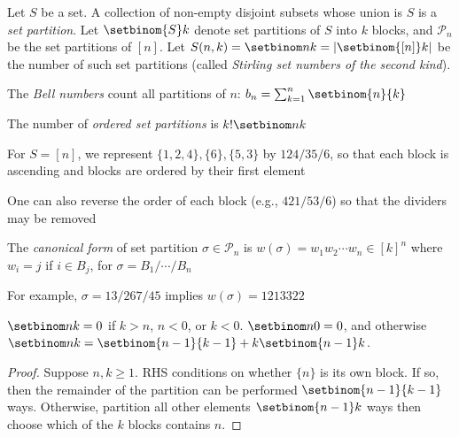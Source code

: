 \documentclass[a4paper]{article}
\begin{document}
\begin{definition}
Let $S$ be a set. A collection of non-empty disjoint subsets whose union is $S$ is a \emph{set partition}. Let $\setbinom{S}k$ denote set partitions of $S$ into $k$ blocks, and $\mathcal P_n$ be the set partitions of $[n]$. Let $S(n,k)=\setbinom nk=\left|\setbinom{[n]}k\right|$ be the number of such set partitions (called \emph{Stirling set numbers of the second kind}).
\begin{arrows}
\item The \emph{Bell numbers} count all partitions of $n$: $b_n=\sum_{k=1}^n\setbinom{n}{k}$
\item The number of \emph{ordered set partitions} is $k!\setbinom nk$
\item For $S=[n]$, we represent $\{1,2,4\},\{6\},\{5,3\}$ by $124/35/6$, so that each block is ascending and blocks are ordered by their first element
\item One can also reverse the order of each block (e.g., $421/53/6$) so that the dividers may be removed
\item The \emph{canonical form} of set partition $\sigma\in\mathcal P_n$ is $w(\sigma)=w_1w_2\cdots w_n\in[k]^n$ where $w_i=j$ if $i\in B_j$, for $\sigma=B_1/\cdots/B_n$
\item For example, $\sigma=13/267/45$ implies $w(\sigma)=1213322$
\end{arrows}
\end{definition}

\begin{theorem}\label{setbinom_recurse}
$\setbinom nk=0$ if $k>n$, $n<0$, or $k<0$. $\setbinom n0=0$, and otherwise $\setbinom nk=\setbinom{n-1}{k-1}+k\setbinom{n-1}k$.

\begin{hl}
\begin{proof}
Suppose $n,k\geq1$. RHS conditions on whether $\{n\}$ is its own block. If so, then the remainder of the partition can be performed $\setbinom{n-1}{k-1}$ ways. Otherwise, partition all other elements $\setbinom{n-1}k$ ways then choose which of the $k$ blocks contains $n$.
\end{proof}
\end{hl}
\end{theorem}
\end{document}
